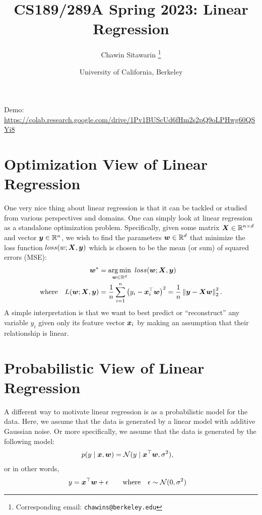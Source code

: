 \documentclass[letterpaper,12pt]{article}
\title{CS189/289A Spring 2023: Linear Regression}
\author{
    Chawin Sitawarin \thanks{Corresponding email: \texttt{chawins@berkeley.edu}}
}
\date{
    University of California, Berkeley
}
\theoremstyle{plain}
\theoremstyle{definition}
\theoremstyle{remark}
\newcommand{\norm}[1]{\left\lVert#1\right\rVert}
\begin{document}
\maketitle

Demo: \url{https://colab.research.google.com/drive/1Pv1BUScUd6fHm2s2pQ9oLPHwg60QSYi8}

\section{Optimization View of Linear Regression}

One very nice thing about linear regression is that it can be tackled or studied from various perspectives and domains.
%
One can simply look at linear regression as a standalone optimization problem.
%
Specifically, given some matrix ${\bm{X}} \in \mathbb{R}^{n \times d}$ and vector ${\bm{y}} \in \mathbb{R}^n$, we wish to find the parameters ${\bm{w}} \in \mathbb{R}^d$ that minimize the loss function $loss(w; {\bm{X}}, {\bm{y}})$ which is chosen to be the mean (or sum) of squared errors (MSE):
\begin{align}
    \vw^*                               & = \argmin_{\vw \in \R^d}~ loss(\vw; \mX, \vy)                                                            \\
    \text{where} \quad L(\vw; \mX, \vy) & = \frac{1}{n} \sum_{i=1}^n \left( y_i - \vx_i^\top \vw \right)^2 = \frac{1}{n} \norm{\vy - \mX \vw}_2^2.
\end{align}
A simple interpretation is that we want to best predict or ``reconstruct'' any variable $y_i$ given only its feature vector ${\bm{x}}_i$ by making an assumption that their relationship is linear.

\section{Probabilistic View of Linear Regression}

A different way to motivate linear regression is as a probabilistic model for the data.
%
Here, we assume that the data is generated by a linear model with additive Gaussian noise.
%
Or more specifically, we assume that the data is generated by the following model:
\begin{align}
    p(y \mid {\bm{x}}, {\bm{w}}) & = \mathcal{N}(y \mid {\bm{x}}^\top {\bm{w}}, \sigma^2), \label{eq:linearRegressionModel}
\end{align}
or in other words,
\begin{align}
    y & = {\bm{x}}^\top {\bm{w}} + \epsilon \qquad \text{where} \quad \epsilon \sim \mathcal{N}(0, \sigma^2)
\end{align}
\end{document}
